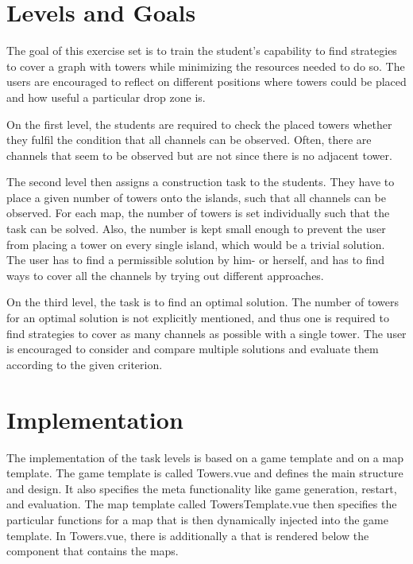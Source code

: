 \section{Levels and Goals}
\label{section:assignment}

The goal of this exercise set is to train the student's capability to find strategies to cover a graph with towers while minimizing the resources needed to do so. The users are encouraged to reflect on different positions where towers could be placed and how useful a particular drop zone is. 

On the first level, the students are required to check the placed towers whether they fulfil the condition that all channels can be observed. Often, there are channels that seem to be observed but are not since there is no adjacent tower.  

The second level then assigns a construction task to the students. They have to place a given number of towers onto the islands, such that all channels can be observed. For each map, the number of towers is set individually such that the task can be solved. Also, the number is kept small enough to prevent the user from placing a tower on every single island, which would be a trivial solution. The user has to find a permissible solution by him- or herself, and has to find ways to cover all the channels by trying out different approaches.

On the third level, the task is to find an optimal solution. The number of towers for an optimal solution is not explicitly mentioned, and thus one is required to find strategies to cover as many channels as possible with a single tower. The user is encouraged to consider and compare multiple solutions and evaluate them according to the given criterion.


\section{Implementation}
\label{section:implementation}
The implementation of the task levels is based on a game template and on a map template. The game template is called Towers.vue and defines the main structure and design. It also specifies the meta functionality like game generation, restart, and evaluation. The map template called TowersTemplate.vue then specifies the particular functions for a map that is then dynamically injected into the game template. In Towers.vue, there is additionally a  that is rendered below the component that contains the maps.

